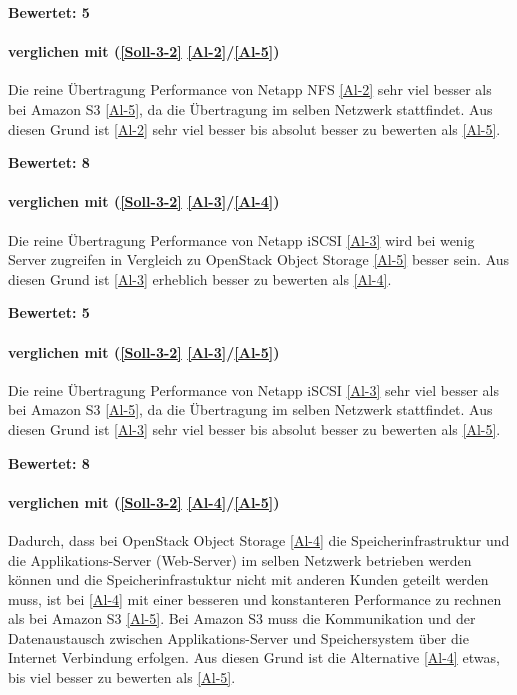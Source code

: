 \textbf{Bewertet: 5}

\paragraph*{  verglichen mit  (\ref{Soll-3-2} \ref{Al-2}/\ref{Al-5})}
Die reine Übertragung Performance von Netapp NFS \ref{Al-2} sehr viel besser als bei Amazon S3 \ref{Al-5}, da die Übertragung im selben Netzwerk stattfindet. Aus diesen Grund ist \ref{Al-2} sehr viel besser bis absolut besser zu bewerten als \ref{Al-5}.

\textbf{Bewertet: 8}

\paragraph*{  verglichen mit  (\ref{Soll-3-2} \ref{Al-3}/\ref{Al-4})}
Die reine Übertragung Performance von Netapp iSCSI \ref{Al-3} wird bei wenig Server zugreifen in Vergleich zu OpenStack Object Storage \ref{Al-5} besser sein. Aus diesen Grund ist \ref{Al-3} erheblich besser zu bewerten als \ref{Al-4}.

\textbf{Bewertet: 5}

\paragraph*{  verglichen mit  (\ref{Soll-3-2} \ref{Al-3}/\ref{Al-5})}
Die reine Übertragung Performance von Netapp iSCSI \ref{Al-3} sehr viel besser als bei Amazon S3 \ref{Al-5}, da die Übertragung im selben Netzwerk stattfindet. Aus diesen Grund ist \ref{Al-3} sehr viel besser bis absolut besser zu bewerten als \ref{Al-5}.

\textbf{Bewertet: 8}

\paragraph*{  verglichen mit  (\ref{Soll-3-2} \ref{Al-4}/\ref{Al-5})}
Dadurch, dass bei OpenStack Object Storage \ref{Al-4} die Speicherinfrastruktur und die Applikations-Server (Web-Server) im selben Netzwerk betrieben werden können und die Speicherinfrastuktur nicht mit anderen Kunden geteilt werden muss, ist bei \ref{Al-4} mit einer besseren und konstanteren Performance zu rechnen als bei Amazon S3 \ref{Al-5}. Bei Amazon S3 muss die Kommunikation und der Datenaustausch zwischen Applikations-Server und Speichersystem über die Internet Verbindung erfolgen. Aus diesen Grund ist die Alternative \ref{Al-4} etwas, bis viel besser zu bewerten als \ref{Al-5}.

